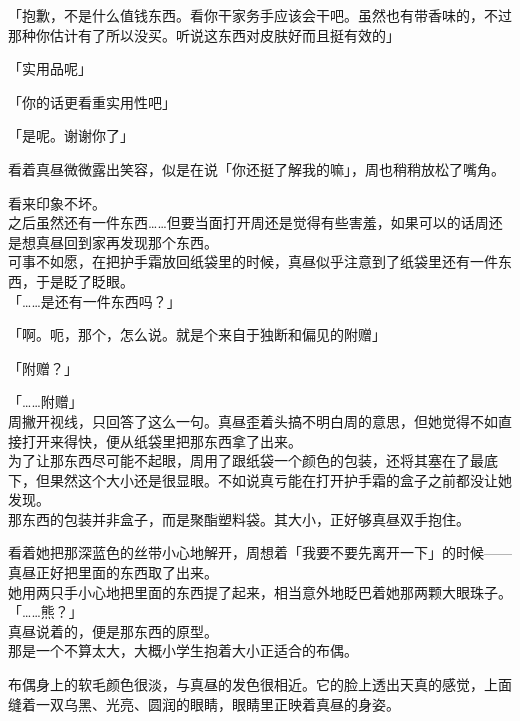 「抱歉，不是什么值钱东西。看你干家务手应该会干吧。虽然也有带香味的，不过那种你估计有了所以没买。听说这东西对皮肤好而且挺有效的」

「实用品呢」

「你的话更看重实用性吧」

「是呢。谢谢你了」

看着真昼微微露出笑容，似是在说「你还挺了解我的嘛」，周也稍稍放松了嘴角。

看来印象不坏。\\

之后虽然还有一件东西……但要当面打开周还是觉得有些害羞，如果可以的话周还是想真昼回到家再发现那个东西。\\

可事不如愿，在把护手霜放回纸袋里的时候，真昼似乎注意到了纸袋里还有一件东西，于是眨了眨眼。\\

「……是还有一件东西吗？」

「啊。呃，那个，怎么说。就是个来自于独断和偏见的附赠」

「附赠？」

「……附赠」\\

周撇开视线，只回答了这么一句。真昼歪着头搞不明白周的意思，但她觉得不如直接打开来得快，便从纸袋里把那东西拿了出来。\\

为了让那东西尽可能不起眼，周用了跟纸袋一个颜色的包装，还将其塞在了最底下，但果然这个大小还是很显眼。不如说真亏能在打开护手霜的盒子之前都没让她发现。\\

那东西的包装并非盒子，而是聚酯塑料袋。其大小，正好够真昼双手抱住。

看着她把那深蓝色的丝带小心地解开，周想着「我要不要先离开一下」的时候——真昼正好把里面的东西取了出来。\\

她用两只手小心地把里面的东西提了起来，相当意外地眨巴着她那两颗大眼珠子。\\

「……熊？」\\

真昼说着的，便是那东西的原型。\\

那是一个不算太大，大概小学生抱着大小正适合的布偶。

布偶身上的软毛颜色很淡，与真昼的发色很相近。它的脸上透出天真的感觉，上面缝着一双乌黑、光亮、圆润的眼睛，眼睛里正映着真昼的身姿。\\

